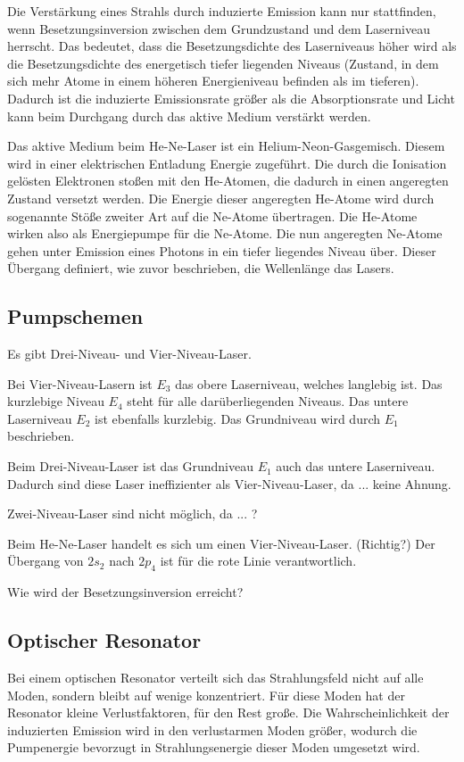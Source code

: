 Die Verstärkung eines Strahls durch induzierte Emission kann nur stattfinden, wenn Besetzungsinversion zwischen dem Grundzustand und dem Laserniveau herrscht. Das bedeutet, dass die Besetzungsdichte des Laserniveaus höher wird als die Besetzungsdichte des energetisch tiefer liegenden Niveaus (Zustand, in dem sich mehr Atome in einem höheren Energieniveau befinden als im tieferen). Dadurch ist die induzierte Emissionsrate größer als die Absorptionsrate und Licht kann beim Durchgang durch das aktive Medium verstärkt werden.

Das aktive Medium beim He-Ne-Laser ist ein Helium-Neon-Gasgemisch. Diesem wird in einer elektrischen Entladung Energie zugeführt. Die durch die Ionisation gelösten Elektronen stoßen mit den He-Atomen, die dadurch in einen angeregten Zustand versetzt werden. Die Energie dieser angeregten He-Atome wird durch sogenannte Stöße zweiter Art auf die Ne-Atome übertragen. Die He-Atome wirken also als Energiepumpe für die Ne-Atome. Die nun angeregten Ne-Atome gehen unter Emission eines Photons in ein tiefer liegendes Niveau über. Dieser Übergang definiert, wie zuvor beschrieben, die Wellenlänge das Lasers.

\subsection{Pumpschemen}
Es gibt Drei-Niveau- und Vier-Niveau-Laser.

Bei Vier-Niveau-Lasern ist $E_3$ das obere Laserniveau, welches langlebig ist. Das kurzlebige Niveau $E_4$ steht für alle darüberliegenden Niveaus. Das untere Laserniveau $E_2$ ist ebenfalls kurzlebig. Das Grundniveau wird durch $E_1$ beschrieben.

Beim Drei-Niveau-Laser ist das Grundniveau $E_1$ auch das untere Laserniveau. Dadurch sind diese Laser ineffizienter als Vier-Niveau-Laser, da ... keine Ahnung.

Zwei-Niveau-Laser sind nicht möglich, da ... ?

Beim He-Ne-Laser handelt es sich um einen Vier-Niveau-Laser. (Richtig?)
Der Übergang von $2s_2$ nach $2p_4$ ist für die rote Linie verantwortlich.

Wie wird der Besetzungsinversion erreicht?

\subsection{Optischer Resonator}
Bei einem optischen Resonator verteilt sich das Strahlungsfeld nicht auf alle Moden, sondern bleibt auf wenige konzentriert. Für diese Moden hat der Resonator kleine Verlustfaktoren, für den Rest große. Die Wahrscheinlichkeit der induzierten Emission wird in den verlustarmen Moden größer, wodurch die Pumpenergie bevorzugt in Strahlungsenergie dieser Moden umgesetzt wird.

